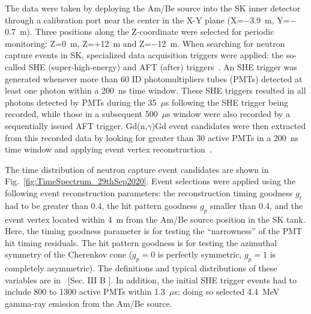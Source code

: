 \documentclass[preprint,12pt]{elsarticle}
\begin{document}
The data were taken by deploying the Am/Be source into the SK inner detector through a calibration port near the center in the X-Y plane (X=$-$3.9~m, Y=$-$0.7~m).
Three positions along the Z-coordinate were selected for periodic monitoring: Z=0~m, Z=$+$12~m and Z=$-$12~m.
When searching for neutron capture events in SK, specialized data acquisition triggers were applied:  the  so-called SHE (super-high-energy) and AFT (after) triggers~\cite{Zhang:2013tua}.
An SHE trigger was generated whenever more than 60 ID  photomultipliers tubes (PMTs) detected at least one photon within a 200~ns time window. These SHE triggers resulted in
all photons detected by PMTs during the 35~$\mu$s following the SHE trigger being recorded, while those in a subsequent 500~$\mu$s window were also recorded by a sequentially issued AFT trigger.
Gd(n,$\gamma$)Gd event candidates were then extracted from this recorded data by looking for greater than 30 active PMTs in a 200~ns time window and applying event vertex reconstruction~\cite{Abe:2016nxk}.

The time distribution of neutron capture event candidates are shown in Fig.~\ref{fig:TimeSpectrum_29thSep2020}.
Event selections were applied using the following event reconstruction parameters: the 
reconstruction timing goodness $g_t$ had to be greater than 0.4, the hit pattern goodness $g_p$ smaller than 0.4, and the event vertex located within 4~m from the Am/Be source position in the SK tank. Here, the timing goodness parameter is for testing the “narrowness” of the PMT hit timing residuals. The hit pattern goodness is for testing the azimuthal symmetry of the Cherenkov cone ($g_p=0$ is perfectly symmetric, $g_p=1$ is completely asymmetric). The definitions and typical distributions of  these variables are in~\cite{Parker:sk2} [Sec. III B ]. 
In addition, the initial SHE trigger events had to include 800 to 1300 active PMTs within 1.3~$\mu$s; doing so selected 4.4~MeV gamma-ray emission from the Am/Be source.
\end{document}
